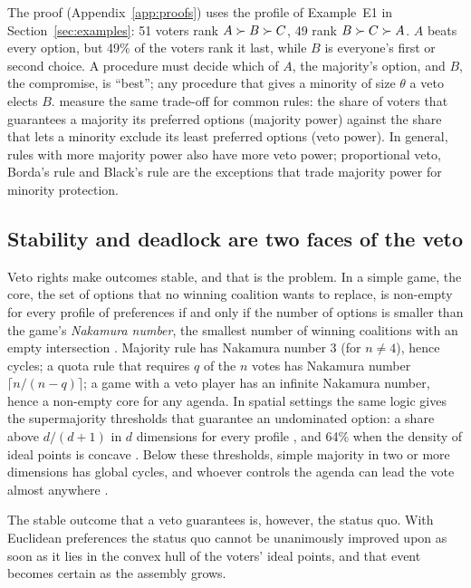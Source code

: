 The proof (Appendix~\ref{app:proofs}) uses the profile of Example~E1 in Section~\ref{sec:examples}: 51
voters rank $A \succ B \succ C$, 49 rank $B \succ C \succ A$. $A$ beats every option, but 49\% of the
voters rank it last, while $B$ is everyone's first or second choice. A procedure must decide which of
$A$, the majority's option, and $B$, the compromise, is ``best''; any procedure that gives a minority of
size $\theta$ a veto elects $B$. \citet{KondratevNesterov2020} measure the same trade-off for common
rules: the share of voters that guarantees a majority its preferred options (majority power) against
the share that lets a minority exclude its least preferred options (veto power). In general, rules with
more majority power also have more veto power; proportional veto, Borda's rule and Black's rule are the
exceptions that trade majority power for minority protection.

\subsection{Stability and deadlock are two faces of the veto}

Veto rights make outcomes stable, and that is the problem. In a simple game, the core, the set of
options that no winning coalition wants to replace, is non-empty for every profile of preferences if
and only if the number of options is smaller than the game's \emph{Nakamura number}, the smallest number
of winning coalitions with an empty intersection \citep{Nakamura1979}. Majority rule has Nakamura number
3 (for $n \neq 4$), hence cycles; a quota rule that requires $q$ of the $n$ votes has Nakamura number
$\lceil n/(n-q) \rceil$; a game with a veto player has an infinite Nakamura number, hence a
non-empty core for any agenda. In spatial settings the same logic gives the supermajority thresholds that
guarantee an undominated option: a share above $d/(d+1)$ in $d$ dimensions for every profile
\citep{Greenberg1979}, and 64\% when the density of ideal points is concave \citep{CaplinNalebuff1988}.
Below these thresholds, simple majority in two or more dimensions has global cycles, and whoever controls
the agenda can lead the vote almost anywhere \citep{McKelvey1976,Plott1967}.

The stable outcome that a veto guarantees is, however, the status quo. With Euclidean preferences the
status quo cannot be unanimously improved upon as soon as it lies in the convex hull of the voters' ideal
points, and that event becomes certain as the assembly grows.

